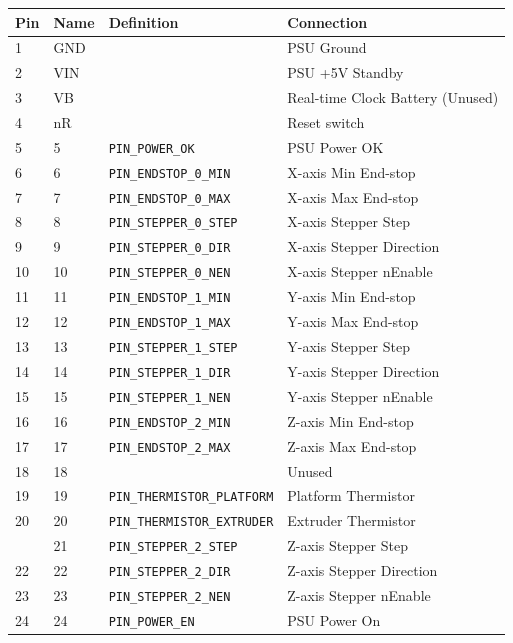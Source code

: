 		
		\begin{table}
			\centering
			\begin{tabular}{l l l l}
				\toprule
				Pin & Name & Definition & Connection \\
				\midrule
				1  & GND & & PSU Ground \\
				2  & VIN & & PSU +5V Standby \\
				3  & VB  & & Real-time Clock Battery (Unused) \\
				4  & nR  & & Reset switch \\
				5  & 5   & \verb|PIN_POWER_OK| & PSU Power OK \\
				6  & 6   & \verb|PIN_ENDSTOP_0_MIN|  & X-axis Min End-stop \\
				7  & 7   & \verb|PIN_ENDSTOP_0_MAX|  & X-axis Max End-stop \\
				8  & 8   & \verb|PIN_STEPPER_0_STEP| & X-axis Stepper Step \\
				9  & 9   & \verb|PIN_STEPPER_0_DIR|  & X-axis Stepper Direction \\
				10 & 10  & \verb|PIN_STEPPER_0_NEN|  & X-axis Stepper nEnable \\
				11 & 11  & \verb|PIN_ENDSTOP_1_MIN|  & Y-axis Min End-stop \\
				12 & 12  & \verb|PIN_ENDSTOP_1_MAX|  & Y-axis Max End-stop \\
				13 & 13  & \verb|PIN_STEPPER_1_STEP| & Y-axis Stepper Step \\
				14 & 14  & \verb|PIN_STEPPER_1_DIR|  & Y-axis Stepper Direction \\
				15 & 15  & \verb|PIN_STEPPER_1_NEN|  & Y-axis Stepper nEnable \\
				16 & 16  & \verb|PIN_ENDSTOP_2_MIN|  & Z-axis Min End-stop \\
				17 & 17  & \verb|PIN_ENDSTOP_2_MAX|  & Z-axis Max End-stop \\
				18 & 18  & & Unused \\
				19 & 19  & \verb|PIN_THERMISTOR_PLATFORM| & Platform Thermistor \\
				20 & 20  & \verb|PIN_THERMISTOR_EXTRUDER| & Extruder Thermistor \\
				\addlinespace
				21 & 21  & \verb|PIN_STEPPER_2_STEP| & Z-axis Stepper Step \\
				22 & 22  & \verb|PIN_STEPPER_2_DIR|  & Z-axis Stepper Direction \\
				23 & 23  & \verb|PIN_STEPPER_2_NEN|  & Z-axis Stepper nEnable \\
				24 & 24  & \verb|PIN_POWER_EN| & PSU Power On \\

\end{tabular}
\end{table}
